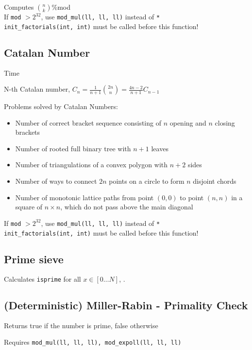 Computes $\binom{n}{k}$\:\%\:mod \\
If \verb|mod| $> 2^{32}$, use \verb|mod_mul(ll, ll, ll)| instead of \verb|*| \\
\verb|init_factorials(int, int)| must be called before this function!


\subsection{Catalan Number}
 Time

N-th Catalan number, $C_n = \frac{1}{n+1}\binom{2n}{n} = \frac{4n-2}{n+1}C_{n-1}$

Problems solved by Catalan Numbers:
\begin{itemize}
	\item Number of correct bracket sequence consisting of $n$ opening and $n$ closing brackets
	\item Number of rooted full binary tree with $n + 1$ leaves
	\item Number of triangulations of a convex polygon with $n + 2$ sides
	\item Number of ways to connect $2n$ points on a circle to form $n$ disjoint chords
	\item Number of monotonic lattice paths from point $(0, 0)$ to point $(n, n)$ in a square of $n \times n$, which do not pass above the main diagonal
\end{itemize}


If \verb|mod| $> 2^{32}$, use \verb|mod_mul(ll, ll, ll)| instead of \verb|*| \\
\verb|init_factorials(int, int)| must be called before this function!



\subsection{Prime sieve}
Calculates \verb|isprime| for all $x \in [0 \ldots N]$, .


\subsection{(Deterministic) Miller-Rabin - Primality Check}
Returns true if the number is prime, false otherwise

Requires \verb|mod_mul(ll, ll, ll), mod_expoll(ll, ll, ll)|



